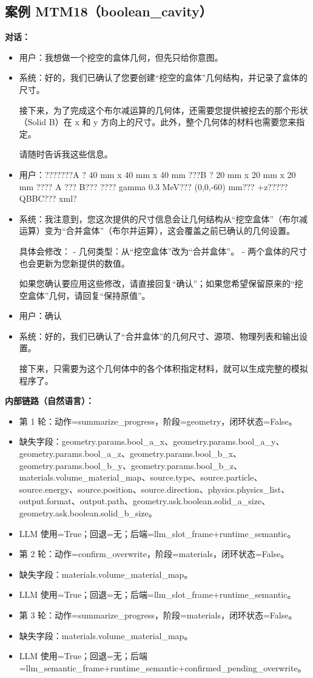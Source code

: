 \documentclass[11pt]{ctexart}
\begin{document}
\subsection{案例 MTM18（boolean\_cavity）}
\textbf{对话：}
\begin{itemize}
\item 用户：我想做一个挖空的盒体几何，但先只给你意图。
\item 系统：好的，我们已确认了您要创建“挖空的盒体”几何结构，并记录了盒体的尺寸。

接下来，为了完成这个布尔减运算的几何体，还需要您提供被挖去的那个形状（Solid B）在 x 和 y 方向上的尺寸。此外，整个几何体的材料也需要您来指定。

请随时告诉我这些信息。
\item 用户：???????A ? 40 mm x 40 mm x 40 mm ???B ? 20 mm x 20 mm x 20 mm ???? A ??? B??? ???? gamma 0.3 MeV??? (0,0,-60) mm??? +z????? QBBC??? xml?
\item 系统：我注意到，您这次提供的尺寸信息会让几何结构从“挖空盒体”（布尔减运算）变为“合并盒体”（布尔并运算），这会覆盖之前已确认的几何设置。

具体会修改：
- 几何类型：从“挖空盒体”改为“合并盒体”。
- 两个盒体的尺寸也会更新为您新提供的数值。

如果您确认要应用这些修改，请直接回复“确认”；如果您希望保留原来的“挖空盒体”几何，请回复“保持原值”。
\item 用户：确认
\item 系统：好的，我们已确认了“合并盒体”的几何尺寸、源项、物理列表和输出设置。

接下来，只需要为这个几何体中的各个体积指定材料，就可以生成完整的模拟程序了。
\end{itemize}
\textbf{内部链路（自然语言）：}
\begin{itemize}
\item 第 1 轮：动作=summarize\_progress，阶段=geometry，闭环状态=False。
\item 缺失字段：geometry.params.bool\_a\_x、geometry.params.bool\_a\_y、geometry.params.bool\_a\_z、geometry.params.bool\_b\_x、geometry.params.bool\_b\_y、geometry.params.bool\_b\_z、materials.volume\_material\_map、source.type、source.particle、source.energy、source.position、source.direction、physics.physics\_list、output.format、output.path、geometry.ask.boolean.solid\_a\_size、geometry.ask.boolean.solid\_b\_size。
\item LLM 使用=True；回退=无；后端=llm\_slot\_frame+runtime\_semantic。
\item 第 2 轮：动作=confirm\_overwrite，阶段=materials，闭环状态=False。
\item 缺失字段：materials.volume\_material\_map。
\item LLM 使用=True；回退=无；后端=llm\_slot\_frame+runtime\_semantic。
\item 第 3 轮：动作=summarize\_progress，阶段=materials，闭环状态=False。
\item 缺失字段：materials.volume\_material\_map。
\item LLM 使用=True；回退=无；后端=llm\_semantic\_frame+runtime\_semantic+confirmed\_pending\_overwrite。
\end{itemize}
\end{document}
